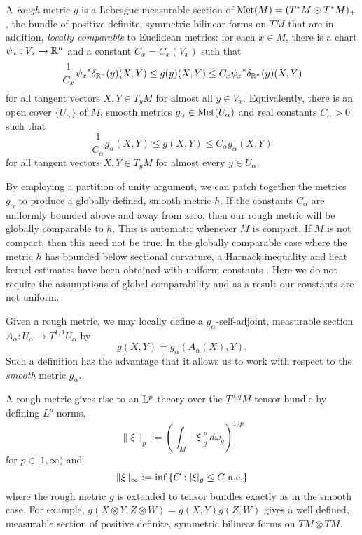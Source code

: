 \documentclass[a4paper, 12pt]{amsart}
\begin{document}
\begin{defn}
\label{defn:rough_metric}
A \emph{rough} metric \(g\) is a Lebesgue measurable section of \(\operatorname{Met}(M) = (T^{\ast} M \odot T^{\ast} M)_+\), the bundle of positive definite, symmetric bilinear forms on \(TM\) that are in addition, \emph{locally comparable} to Euclidean metrics:
for each $x \in M$, there is a chart $\psi_x:V_x \to \mathbb{R}^n$ and a constant $C_x = C_x(V_x)$ such that
\[
\frac{1}{C_{x}} {\psi_x}^\ast\delta_{\mathbb{R}^n}(y) (X, Y) \leq g(y)(X, Y) \leq C_{x} {\psi_x}^\ast\delta_{\mathbb{R}^n}(y) (X, Y)
\]
for all tangent vectors \(X, Y \in T_yM\) for almost all $y \in V_x$. Equivalently, there is an open cover \(\lbrace U_{\alpha} \rbrace\) of \(M\), smooth metrics \(g_{\alpha} \in \operatorname{Met}(U_{\alpha})\) and real constants \(C_{\alpha} > 0\) such that
\[
\frac{1}{C_{\alpha}} g_{\alpha} (X, Y) \leq g(X, Y) \leq C_{\alpha} g_{\alpha} (X, Y)
\]
for all tangent vectors \(X, Y \in T_yM\) for almost every $y \in U_\alpha$.
\end{defn}

\begin{rem}
By employing a partition of unity argument, we can patch together the metrics \(g_{\alpha}\) to produce a globally defined, smooth metric \(h\). If the constants \(C_{\alpha}\) are uniformly bounded above and away from zero, then our rough metric will be globally comparable to \(h\). This is automatic whenever \(M\) is compact. If \(M\) is not compact, then this need not be true. In the globally comparable case where the metric \(h\) has bounded below sectional curvature, a Harnack inequality and heat kernel estimates have been obtained with uniform constants \cite{SC}. Here we do not require the assumptions of global comparability and as a result our constants are not uniform.
\end{rem}

Given a rough metric, we may locally define a \(g_{\alpha}\)-self-adjoint, measurable section \(A_{\alpha} : U_{\alpha} \to T^{1,1}U_{\alpha}\) by
\[
g(X, Y) = g_{\alpha} (A_{\alpha} (X), Y).
\]
Such a definition has the advantage that it allows us to work with respect to the \emph{smooth} metric \(g_{\alpha}\).

A rough metric gives rise to an ${\rm L}^{p}_{\rm {}}$-theory over the $T^{p,q}M$ tensor bundle by defining \(L^p\) norms,
\[
\|\xi\|_p := \left(\int_{M} |\xi|_{g}^p\ d\omega_g\right)^{1/p}
\]
for $p \in [1, \infty)$ and
\[
\|\xi\|_{\infty} := \inf\left\{C: |\xi|_g \leq C\ \text{a.e.}\right\}
\]
where the rough metric \(g\) is extended to tensor bundles exactly as in the smooth case. For example, \(g(X \otimes Y, Z \otimes W) = g(X, Y) g(Z, W)\) gives a well defined, measurable section of positive definite, symmetric bilinear forms on \(TM \otimes TM\).
\end{document}
